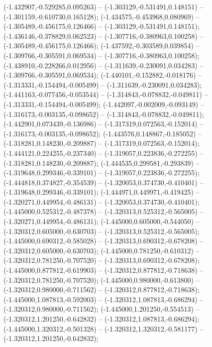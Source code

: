  (-1.432907,-0.529285,0.095263) -- (-1.303129,-0.531491,0.148151) -- (-1.301159,-0.610730,0.165128);
 (-1.434575,-0.453968,0.080969) -- (-1.305489,-0.456175,0.126466) -- (-1.303129,-0.531491,0.148151);
 (-1.436146,-0.378829,0.062523) -- (-1.307716,-0.380963,0.100258) -- (-1.305489,-0.456175,0.126466);
 (-1.437592,-0.303589,0.039854) -- (-1.309766,-0.305591,0.069534) -- (-1.307716,-0.380963,0.100258);
 (-1.438910,-0.228266,0.012956) -- (-1.311639,-0.230091,0.034283) -- (-1.309766,-0.305591,0.069534);
 (-1.440101,-0.152882,-0.018176) -- (-1.313331,-0.154494,-0.005499) -- (-1.311639,-0.230091,0.034283);
 (-1.441163,-0.077456,-0.053544) -- (-1.314843,-0.078832,-0.049811) -- (-1.313331,-0.154494,-0.005499);
 (-1.442097,-0.002009,-0.093149) -- (-1.316173,-0.003135,-0.098652) -- (-1.314843,-0.078832,-0.049811);
 (-1.442901,0.073439,-0.136986) -- (-1.317319,0.072563,-0.152014) -- (-1.316173,-0.003135,-0.098652);
 (-1.443576,0.148867,-0.185052) -- (-1.318281,0.148230,-0.209887) -- (-1.317319,0.072563,-0.152014);
 (-1.444121,0.224255,-0.237340) -- (-1.319057,0.223836,-0.272255) -- (-1.318281,0.148230,-0.209887);
 (-1.444535,0.299581,-0.293839) -- (-1.319648,0.299346,-0.339101) -- (-1.319057,0.223836,-0.272255);
 (-1.444818,0.374827,-0.354539) -- (-1.320053,0.374730,-0.410401) -- (-1.319648,0.299346,-0.339101);
 (-1.444971,0.449971,-0.419425) -- (-1.320271,0.449954,-0.486131) -- (-1.320053,0.374730,-0.410401);
 (-1.445000,0.525312,-0.487378) -- (-1.320313,0.525312,-0.565005) -- (-1.320271,0.449954,-0.486131);
 (-1.445000,0.605000,-0.544050) -- (-1.320312,0.605000,-0.630703) -- (-1.320313,0.525312,-0.565005);
 (-1.445000,0.690312,-0.585028) -- (-1.320313,0.690312,-0.678208) -- (-1.320312,0.605000,-0.630703);
 (-1.445000,0.781250,-0.610312) -- (-1.320312,0.781250,-0.707520) -- (-1.320313,0.690312,-0.678208);
 (-1.445000,0.877812,-0.619903) -- (-1.320312,0.877812,-0.718638) -- (-1.320312,0.781250,-0.707520);
 (-1.445000,0.980000,-0.613800) -- (-1.320312,0.980000,-0.711562) -- (-1.320312,0.877812,-0.718638);
 (-1.445000,1.087813,-0.592003) -- (-1.320312,1.087813,-0.686294) -- (-1.320312,0.980000,-0.711562);
 (-1.445000,1.201250,-0.554513) -- (-1.320312,1.201250,-0.642832) -- (-1.320312,1.087813,-0.686294);
 (-1.445000,1.320312,-0.501328) -- (-1.320312,1.320312,-0.581177) -- (-1.320312,1.201250,-0.642832);
